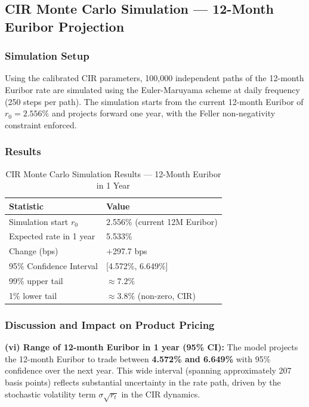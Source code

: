 \documentclass[12pt,a4paper]{article}
\newcommand{\thead}[1]{\cellcolor{headernavy}\color{white}\textbf{#1}}
\newcommand{\rowA}{\rowcolor{white}}
\newcommand{\rowB}{\rowcolor{rowgray}}
\begin{document}
\subsection{CIR Monte Carlo Simulation --- 12-Month Euribor Projection}

\subsubsection{Simulation Setup}

Using the calibrated CIR parameters, 100,000 independent paths of the 12-month Euribor rate are simulated using the Euler-Maruyama scheme at daily frequency (250 steps per path). The simulation starts from the current 12-month Euribor of $r_0 = 2.556\%$ and projects forward one year, with the Feller non-negativity constraint enforced.

\subsubsection{Results}

\begin{table}[H]
  \centering
  \caption{CIR Monte Carlo Simulation Results --- 12-Month Euribor in 1 Year}
  \label{tab:cir_sim}
  \begin{tabular}{ll}
    \hline
    \thead{Statistic} & \thead{Value} \\
    \hline
    \rowA Simulation start $r_0$   & 2.556\% (current 12M Euribor) \\
    \rowB Expected rate in 1 year  & 5.533\% \\
    \rowA Change (bps)             & $+$297.7 bps \\
    \rowB 95\% Confidence Interval & [4.572\%, 6.649\%] \\
    \rowA 99\% upper tail          & $\approx 7.2\%$ \\
    \rowB 1\% lower tail           & $\approx 3.8\%$ (non-zero, CIR) \\
    \hline
  \end{tabular}
\end{table}

\subsubsection{Discussion and Impact on Product Pricing}

\textbf{(vi) Range of 12-month Euribor in 1 year (95\% CI):} The model projects the 12-month Euribor to trade between \textbf{4.572\% and 6.649\%} with 95\% confidence over the next year. This wide interval (spanning approximately 207 basis points) reflects substantial uncertainty in the rate path, driven by the stochastic volatility term $\sigma\sqrt{r_t}$ in the CIR dynamics.
\end{document}
